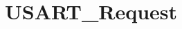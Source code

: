 \hypertarget{group___u_s_a_r_t___request}{\section{U\-S\-A\-R\-T\-\_\-\-Request}
\label{group___u_s_a_r_t___request}
}
